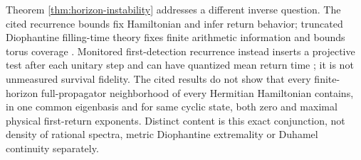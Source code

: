 Theorem \ref{thm:horizon-instability} addresses a different inverse question.
The cited recurrence bounds fix Hamiltonian and infer return behavior;
truncated Diophantine filling-time theory fixes finite arithmetic information
and bounds torus coverage \cite{DumasFischler2022}.  Monitored first-detection
recurrence instead inserts a projective test after each unitary step and can
have quantized mean return time \cite{GrunbaumEtAl2013}; it is not unmeasured
survival fidelity.  The cited results do not show that every finite-horizon
full-propagator neighborhood of every Hermitian Hamiltonian
contains, in one common eigenbasis and for same cyclic state, both zero and
maximal physical first-return exponents.  Distinct content is this exact
conjunction, not density of rational spectra, metric Diophantine extremality
or Duhamel continuity separately.

